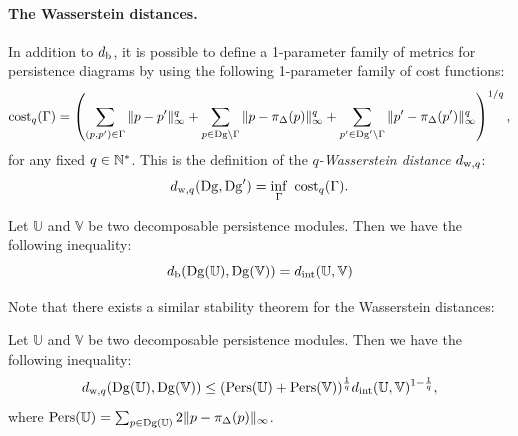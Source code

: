 \paragraph*{The Wasserstein distances.} In addition to $d_{\rm b}$, it is possible to define a 1-parameter family of metrics for persistence diagrams by
using the following 1-parameter family of cost functions:
\[
\text{cost}_q(\Gamma)=\left(\sum_{(p,p')\in\Gamma}\|p-p'\|_\infty^q + \sum_{p\in\mathrm{Dg}\setminus \Gamma}\|p-\pi_\Delta(p)\|_\infty^q +
\sum_{p'\in\mathrm{Dg}'\setminus \Gamma}\|p'-\pi_\Delta(p')\|_\infty^q\right)^{1/q},
\]
for any fixed $q\in\mathbb{N}^*$. This is the definition of the {\em $q$-Wasserstein distance} $d_{{\rm w},q}$:
$$d_{{\rm w},q}(\mathrm{Dg},\mathrm{Dg}')=\inf_\Gamma\ {\rm cost}_q(\Gamma).$$



\begin{thm}  
Let $\mathbb{U}$ and $\mathbb{V}$ be two decomposable persistence modules. 
Then we have the following inequality: 
\begin{equation} 
d_{\rm b}(\mathrm{Dg}(\mathbb{U}),\mathrm{Dg}(\mathbb{V})) = d_{\rm int}(\mathbb{U},\mathbb{V})
\end{equation}
\end{thm}

Note that there exists a similar stability theorem for the Wasserstein distances:

\begin{thm}  
Let $\mathbb{U}$ and $\mathbb{V}$ be two decomposable persistence modules. 
Then we have the following inequality: 
\begin{equation} 
d_{{\rm w},q}(\mathrm{Dg}(\mathbb{U}),\mathrm{Dg}(\mathbb{V})) \leq ({\rm Pers}(\mathbb{U}) + {\rm Pers}(\mathbb{V}))^{\frac 1q} d_{\rm int}(\mathbb{U},\mathbb{V})^{1-\frac 1q},
\end{equation}
where ${\rm Pers}(\mathbb{U})=\sum_{p\in\mathrm{Dg}(\mathbb{U})} 2\|p-\pi_\Delta(p)\|_\infty$.
\end{thm}

